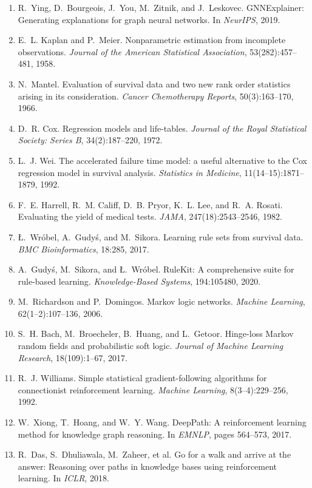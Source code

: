 \documentclass{mnnit}
\begin{document}
\begin{enumerate}
\item\label{ref:gnnexplainer} R.~Ying, D.~Bourgeois, J.~You, M.~Zitnik, and J.~Leskovec. GNNExplainer: Generating explanations for graph neural networks. In \emph{NeurIPS}, 2019.
\item\label{ref:km} E.~L. Kaplan and P.~Meier. Nonparametric estimation from incomplete observations. \emph{Journal of the American Statistical Association}, 53(282):457--481, 1958.
\item\label{ref:logrank} N.~Mantel. Evaluation of survival data and two new rank order statistics arising in its consideration. \emph{Cancer Chemotherapy Reports}, 50(3):163--170, 1966.
\item\label{ref:cox} D.~R. Cox. Regression models and life-tables. \emph{Journal of the Royal Statistical Society: Series B}, 34(2):187--220, 1972.
\item\label{ref:aft} L.~J. Wei. The accelerated failure time model: a useful alternative to the Cox regression model in survival analysis. \emph{Statistics in Medicine}, 11(14--15):1871--1879, 1992.
\item\label{ref:harrell} F.~E. Harrell, R.~M. Califf, D.~B. Pryor, K.~L. Lee, and R.~A. Rosati. Evaluating the yield of medical tests. \emph{JAMA}, 247(18):2543--2546, 1982.
\item\label{ref:lrrules} \L.~Wr\'obel, A.~Gudy\'s, and M.~Sikora. Learning rule sets from survival data. \emph{BMC Bioinformatics}, 18:285, 2017.
\item\label{ref:rulekit} A.~Gudy\'s, M.~Sikora, and \L.~Wr\'obel. RuleKit: A comprehensive suite for rule-based learning. \emph{Knowledge-Based Systems}, 194:105480, 2020.
\item\label{ref:mln} M.~Richardson and P.~Domingos. Markov logic networks. \emph{Machine Learning}, 62(1--2):107--136, 2006.
\item\label{ref:psl} S.~H. Bach, M.~Broecheler, B.~Huang, and L.~Getoor. Hinge-loss Markov random fields and probabilistic soft logic. \emph{Journal of Machine Learning Research}, 18(109):1--67, 2017.
\item\label{ref:reinforce} R.~J. Williams. Simple statistical gradient-following algorithms for connectionist reinforcement learning. \emph{Machine Learning}, 8(3--4):229--256, 1992.
\item\label{ref:deeppath} W.~Xiong, T.~Hoang, and W.~Y. Wang. DeepPath: A reinforcement learning method for knowledge graph reasoning. In \emph{EMNLP}, pages 564--573, 2017.
\item\label{ref:minerva} R.~Das, S.~Dhuliawala, M.~Zaheer, et al. Go for a walk and arrive at the answer: Reasoning over paths in knowledge bases using reinforcement learning. In \emph{ICLR}, 2018.

\end{enumerate}
\end{document}
